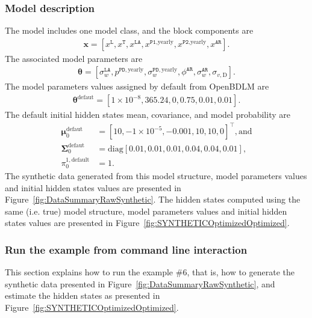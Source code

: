 \subsubsection{Model description}
The model includes one model class, and the block components are 
\begin{gather*}
\textbf{x}=[x^{\mathtt{L}}, x^{\mathtt{T}}, x^{\mathtt{LA}}, x^{\mathtt{P1}\text{,yearly}}, x^{\mathtt{P2}\text{,yearly}}, x^{\mathtt{AR}}].
\end{gather*}
The associated model parameters are
\begin{gather*}
\bm\theta=[\sigma_{w}^{\mathtt{LA}}, p^{\mathtt{PD}, \text{yearly}}, \sigma_{w}^{\mathtt{PD}, \text{yearly}}, \phi^{\mathtt{AR}}, \sigma_{w}^{\mathtt{AR}}, \sigma_{v,\text{D}}].
 \end{gather*}
The model parameters values assigned by default from OpenBDLM are
\begin{gather*}
\bm\theta^{\text{defaut}}=[ 1\times10^{-8}, 365.24, 0, 0.75, 0.01, 0.01].
\end{gather*}
The default initial hidden states mean, covariance, and model probability are 
\begin{align*}
\bm \mu^{\text{defaut}}_{0} & = [	 10  , -1\times10^{-5}  ,	-0.001	,	10  ,  	10    ,	0  ]^{\intercal}, \text{and} \\
\bm\Sigma^{\text{defaut}}_{0} & = \text{diag}[ 0.01  ,	0.01  ,	0.01  	,0.04  ,	0.04  ,	0.01 ], \\
 \pi_{0}^{1,\text{default}} & = 1.
 \end{align*}
The synthetic data generated from this model structure, model parameters values and initial hidden states values are presented in Figure~\ref{fig:DataSummaryRawSynthetic}.
The hidden states computed using the same (i.e. true) model structure, model parameters values and initial hidden states values are presented in Figure~\ref{fig:SYNTHETICOptimizedOptimized}.

\subsubsection{Run the example from command line interaction}

This section explains how to run the example \#6, that is, how to generate the synthetic data presented in Figure~\ref{fig:DataSummaryRawSynthetic}, and estimate the hidden states as presented in Figure~\ref{fig:SYNTHETICOptimizedOptimized}.


